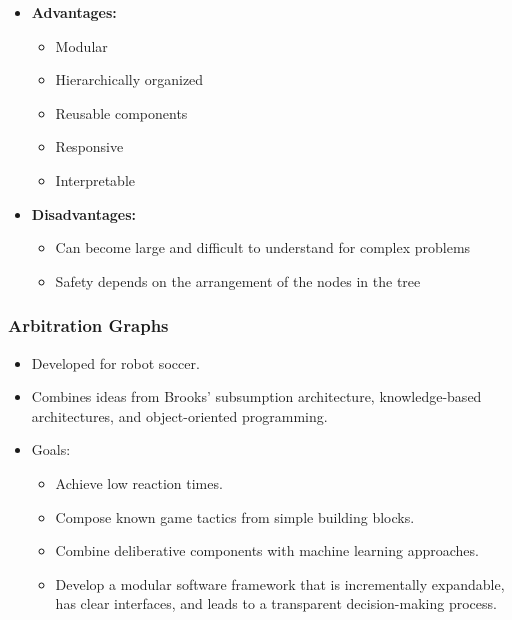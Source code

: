 \begin{itemize}
\item \textbf{Advantages:}
\begin{itemize}
    \item Modular
    \item Hierarchically organized
    \item Reusable components
    \item Responsive
    \item Interpretable
\end{itemize}

\item \textbf{Disadvantages:}
\begin{itemize}
    \item Can become large and difficult to understand for complex problems
    \item Safety depends on the arrangement of the nodes in the tree
\end{itemize}
\end{itemize}

\subsubsection*{Arbitration Graphs}

\begin{itemize}
    \item Developed for robot soccer.
    \item Combines ideas from Brooks' subsumption architecture, knowledge-based architectures, and object-oriented programming.
    \item Goals:
          \begin{itemize}
              \item Achieve low reaction times.
              \item Compose known game tactics from simple building blocks.
              \item Combine deliberative components with machine learning approaches.
              \item Develop a modular software framework that is incrementally expandable, has clear interfaces, and leads to a transparent decision-making process.
          \end{itemize}
\end{itemize}

